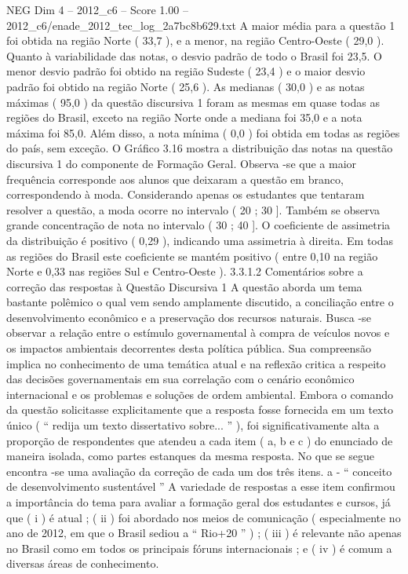 \begin{textsample}{NEG Dim 4 – 2012\_c6 – Score 1.00 – 2012\_c6/enade\_2012\_tec\_log\_2a7bc8b629.txt}
A maior média para a questão 1 foi obtida na região Norte ( 33,7 ), e a menor, na região Centro-Oeste ( 29,0 ).
Quanto à variabilidade das notas, o desvio padrão de todo o Brasil foi 23,5.
O menor desvio padrão foi obtido na região Sudeste ( 23,4 ) e o maior desvio padrão foi obtido na região Norte ( 25,6 ).
As medianas ( 30,0 ) e as notas máximas ( 95,0 ) da questão discursiva 1 foram as mesmas em quase todas as regiões do Brasil, exceto na região Norte onde a mediana foi 35,0 e a nota máxima foi 85,0.
Além disso, a nota mínima ( 0,0 ) foi obtida em todas as regiões do país, sem exceção.
O Gráfico 3.16 mostra a distribuição das notas na questão discursiva 1 do componente de Formação Geral.
Observa -se que a maior frequência corresponde aos alunos que deixaram a questão em branco, correspondendo à moda.
Considerando apenas os estudantes que tentaram resolver a questão, a moda ocorre no intervalo ( 20 ; 30 ].
Também se observa grande concentração de nota no intervalo ( 30 ; 40 ].
O coeficiente de assimetria da distribuição é positivo ( 0,29 ), indicando uma assimetria à direita.
Em todas as regiões do Brasil este coeficiente se mantém positivo ( entre 0,10 na região Norte e 0,33 nas regiões Sul e Centro-Oeste ). 3.3.1.2 Comentários sobre a correção das respostas à Questão Discursiva 1 A questão aborda um tema bastante polêmico o qual vem sendo amplamente discutido, a conciliação entre o desenvolvimento econômico e a preservação dos recursos naturais.
Busca -se observar a relação entre o estímulo governamental à compra de veículos novos e os impactos ambientais decorrentes desta política pública.
Sua compreensão implica no conhecimento de uma temática atual e na reflexão critica a respeito das decisões governamentais em sua correlação com o cenário econômico internacional e os problemas e soluções de ordem ambiental.
Embora o comando da questão solicitasse explicitamente que a resposta fosse fornecida em um texto único ( “ redija um texto dissertativo sobre... ” ), foi significativamente alta a proporção de respondentes que atendeu a cada item ( a, b e c ) do enunciado de maneira isolada, como partes estanques da mesma resposta.
No que se segue encontra -se uma avaliação da correção de cada um dos três itens. a - “ conceito de desenvolvimento sustentável ” A variedade de respostas a esse item confirmou a importância do tema para avaliar a formação geral dos estudantes e cursos, já que ( i ) é atual ; ( ii ) foi abordado nos meios de comunicação ( especialmente no ano de 2012, em que o Brasil sediou a “ Rio+20 ” ) ; ( iii ) é relevante não apenas no Brasil como em todos os principais fóruns internacionais ; e ( iv ) é comum a diversas áreas de conhecimento.

\end{textsample}
